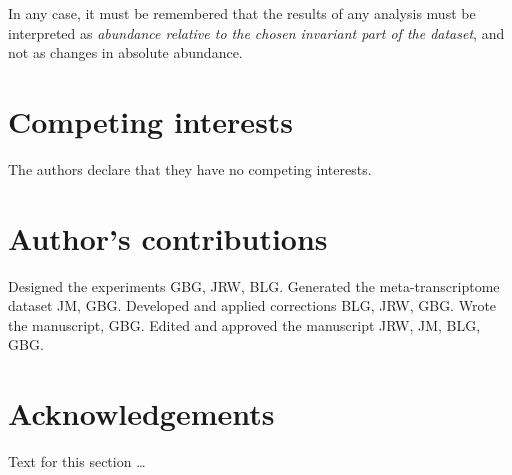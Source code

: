 \documentclass{bmcart}
\begin{document}
In any case, it must be remembered that the results of any analysis must be interpreted as \emph{abundance relative to the chosen invariant part of the dataset}, and not as changes in absolute abundance.



\begin{backmatter}

\section*{Competing interests}
  The authors declare that they have no competing interests.

\section*{Author's contributions}
    Designed the experiments GBG, JRW, BLG. Generated the meta-transcriptome dataset JM, GBG. Developed and applied corrections BLG, JRW, GBG. Wrote the manuscript, GBG. Edited and approved the manuscript JRW, JM, BLG, GBG.

\section*{Acknowledgements}
  Text for this section \ldots



\end{backmatter}
\end{document}
